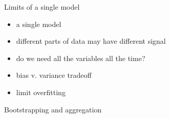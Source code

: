 \documentclass[12pt, smalloffset, compress, aspectratio=1610]{beamer}
\providecommand{\tightlist}{%
  \setlength{\itemsep}{0pt}\setlength{\parskip}{0pt}}
\begin{document}
\begin{frame}{Limits of a single model}
\label{limits-of-a-single-model}
\begin{itemize}
\tightlist
\item
  a single model
\item
  different parts of data may have different signal
\item
  do we need all the variables all the time?
\item
  bias v. variance tradeoff
\item
  limit overfitting
\end{itemize}
\end{frame}

\begin{frame}{Bootstrapping and aggregation}
\label{bootstrapping-and-aggregation}
\end{frame}
\end{document}
